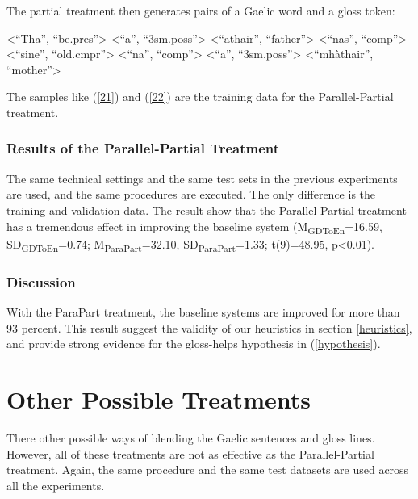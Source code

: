 \documentclass[11pt,a4paper]{article}
\begin{document}
The partial treatment then generates pairs of a Gaelic word and a gloss token: 
\begin{exe}
	\ex\label{22}
	\begin{xlist}
		\ex <``Tha'', ``be.pres''>
		\ex <``a'', ``3sm.poss''>
		\ex <``athair'', ``father''>
		\ex <``nas'', ``comp''>
		\ex <``sine'', ``old.cmpr''>
		\ex <``na'', ``comp''>
		\ex <``a'', ``3sm.poss''>
		\ex <``mh\`athair'', ``mother''>
	\end{xlist}
\end{exe}

The samples like (\ref{21}) and (\ref{22}) are the training data for the Parallel-Partial treatment. 

\subsubsection{Results of the Parallel-Partial Treatment}
The same technical settings and the same test sets in the previous experiments are used, and the same procedures are executed. 
The only difference is the training and validation data. The result show that the Parallel-Partial treatment has a tremendous effect in improving the baseline system (M\textsubscript{GDToEn}=16.59, SD\textsubscript{GDToEn}=0.74; M\textsubscript{ParaPart}=32.10, SD\textsubscript{ParaPart}=1.33; t(9)=48.95, p<0.01). 

\subsubsection{Discussion}
With the ParaPart treatment, the baseline systems are improved for more than 93 percent. This result suggest the validity of our heuristics in section \ref{heuristics}, and provide strong evidence for the gloss-helps hypothesis in (\ref{hypothesis}).      





\section{Other Possible Treatments}
There other possible ways of blending the Gaelic sentences and gloss lines. However, all of these treatments are not as effective as the Parallel-Partial treatment. Again, the same procedure and the same test datasets are used across all the experiments.    
\end{document}
